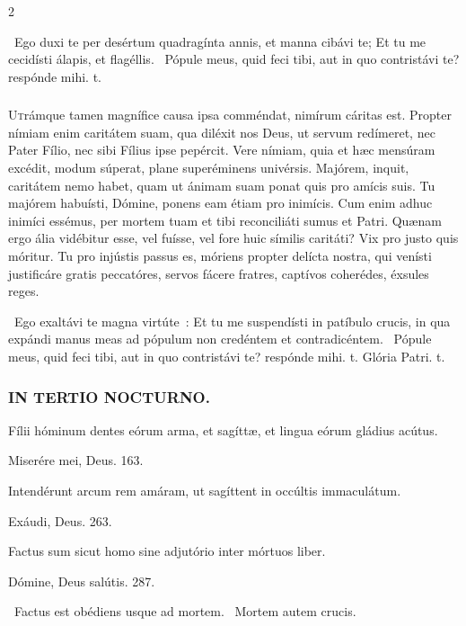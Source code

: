 \documentclass[9pt,twoside]{extarticle}
\begin{document}
\begin{multicols}{2}
{{{\begin{tightlist}{}
\item {}~Ego duxi te per desértum quadragínta annis, et manna cibávi te; \textred{*} Et tu me cecidísti álapis, et flagéllis. ~Pópule meus, quid feci tibi, aut in quo contristávi te? respónde mihi. t.
\end{tightlist}

\subsubsection*{\center {}}
\lettrine{U}trámque tamen magnífice causa ipsa comméndat, nimírum cáritas est. Propter nímiam enim caritátem suam, qua diléxit nos Deus, ut servum redímeret, nec Pater Fílio, nec sibi Fílius ipse pepércit. Vere nímiam, quia et hæc mensúram excédit, modum súperat, plane superéminens univérsis. Majórem, inquit, caritátem nemo habet, quam ut ánimam suam ponat quis pro amícis suis. Tu majórem habuísti, Dómine, ponens eam étiam pro inimícis. Cum enim adhuc inimíci essémus, per mortem tuam et tibi reconciliáti sumus et Patri. Quænam ergo ália vidébitur esse, vel fuísse, vel fore huic símilis caritáti? Vix pro justo quis móritur. Tu pro injústis passus es, móriens propter delícta nostra, qui venísti justificáre gratis peccatóres, servos fácere fratres, captívos coherédes, éxsules reges.

\begin{tightlist}{}
\item {}~Ego exaltávi te magna virtúte~: \textred{*} Et tu me suspendísti in patíbulo crucis, in qua expándi manus meas ad pópulum non credéntem et contradicéntem. ~Pópule meus, quid feci tibi, aut in quo contristávi te? respónde mihi. t. Glória Patri. t.
\end{tightlist}

\subsubsection*{\center \textsc{IN TERTIO NOCTURNO.}}
\begin{tightlist}{}
\item {} Fílii hóminum dentes eórum arma, et sagíttæ, et lingua eórum gládius acútus.
\item {} Miserére mei, Deus. 163.
\item {} Intendérunt arcum rem amáram, ut sagíttent in occúltis immaculátum.
\item {} Exáudi, Deus. 263.
\item {} Factus sum sicut homo sine adjutório inter mórtuos liber.
\item {} Dómine, Deus salútis. 287.
\item {}~Factus est obédiens usque ad mortem. ~Mortem autem crucis.
\end{tightlist}

}}}
\end{multicols}
\end{document}
